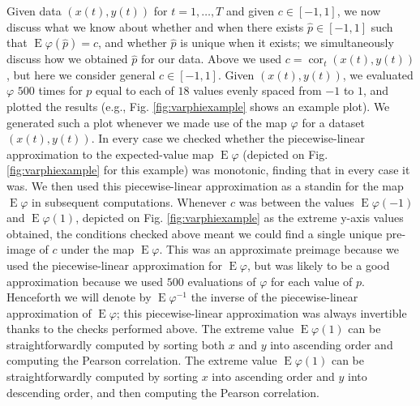 \documentclass[letterpaper,11pt]{article}
\newcommand{\E}{\operatorname{E}}
\newcommand{\cor}{\operatorname{cor}}
\begin{document}
Given data $(x(t),y(t))$ for $t=1,\ldots,T$ and given $c \in [-1,1]$,
we now discuss what we know about whether and when there exists $\hat{p} \in [-1,1]$ such 
that $\E\varphi(\hat{p})=c$, and whether $\hat{p}$ is unique when it 
exists; we simultaneously discuss how we obtained $\hat{p}$ for our data.
Above we used $c=\cor_t(x(t),y(t))$, but here we consider general $c \in [-1,1]$. 
Given $(x(t),y(t))$, we evaluated $\varphi$ $500$ times for $p$ equal to each
of $18$ values evenly spaced from $-1$ to $1$, and plotted the results (e.g., Fig. 
\ref{fig:varphiexample} shows an example plot). We generated such a plot
whenever we made use of the map $\varphi$ for a dataset $(x(t),y(t))$.
In every case we checked whether the piecewise-linear approximation 
to the expected-value map $\E\varphi$ (depicted on Fig. \ref{fig:varphiexample} 
for this example) was monotonic, finding that in every case it was. We then
used this piecewise-linear approximation as a standin for the map
$\E\varphi$ in subsequent computations. Whenever $c$ was between the values
$\E\varphi(-1)$ and $\E\varphi(1)$, depicted on Fig. \ref{fig:varphiexample}
as the extreme y-axis values obtained, the conditions checked above meant we could
find a single unique pre-image of $c$ under the map $\E\varphi$. This was 
an approximate preimage because we used the piecewise-linear approximation for 
$\E\varphi$, but was likely to be a good approximation because we used $500$
evaluations of $\varphi$ for each value of $p$.
Henceforth we will denote by $\E\varphi^{-1}$ the inverse of the piecewise-linear
approximation of $\E\varphi$; this piecewise-linear approximation was always invertible
thanks to the checks performed above. The extreme value 
$\E\varphi(1)$ can be straightforwardly
computed by sorting both $x$ and $y$ into ascending order and computing the Pearson correlation.
The extreme value $\E\varphi(1)$ can be straightforwardly
computed by sorting $x$ into ascending order and $y$ into descending order, and
then computing the Pearson correlation.
\end{document}
